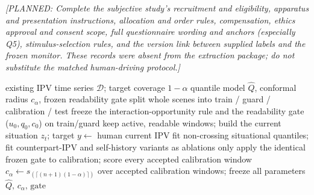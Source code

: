 \documentclass[12pt,a4paper]{article}
\newcommand{\planned}[1]{{\color{blue!60!black}\textit{[PLANNED: #1]}}}
\begin{document}
\planned{Complete the subjective study's recruitment and eligibility, apparatus and presentation
instructions, allocation and order rules, compensation, ethics approval and consent scope, full
questionnaire wording and anchors (especially Q5), stimulus-selection rules, and the version link
between supplied labels and the frozen monitor. These records were absent from the extraction
package; do not substitute the matched human-driving protocol.}

\begin{algorithm}[t]
\caption{Offline calibration of the context-conditioned reference range}
\label{alg:calib}
\begin{algorithmic}[1]
\REQUIRE existing IPV time series $\mathcal{D}$; target coverage $1-\alpha$
\ENSURE quantile model $\hat{Q}$, conformal radius $c_\alpha$, frozen readability gate
\STATE split whole scenes into train / guard / calibration / test
\STATE freeze the interaction-opportunity rule and the readability gate ($u_0,q_0,c_0$) on train/guard
    \STATE keep active, readable windows; build the current situation $z_t$; target $y\leftarrow$ human current IPV
\ENDFOR
\STATE fit non-crossing situational quantiles; fit counterpart-IPV and self-history variants as ablations only
\STATE apply the identical frozen gate to calibration; score every accepted calibration window
\STATE $c_\alpha\leftarrow s_{(\lceil(n+1)(1-\alpha)\rceil)}$ over accepted calibration windows; freeze all parameters
\RETURN $\hat{Q},\,c_\alpha,\,\text{gate}$ 
\end{algorithmic}
\end{algorithm}
\end{document}
